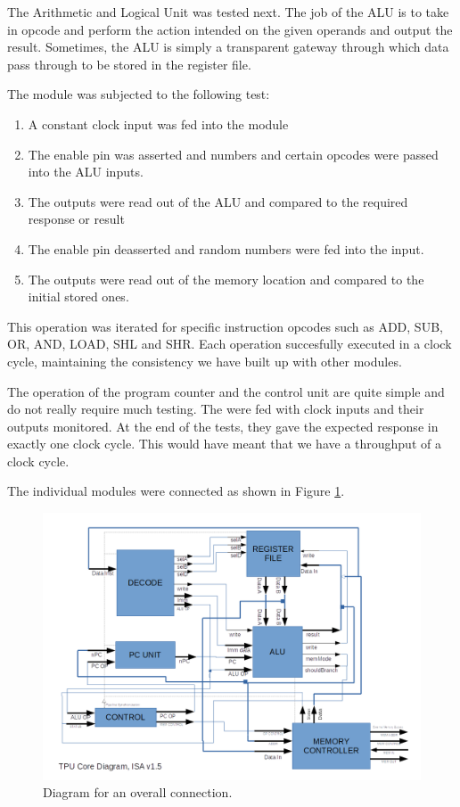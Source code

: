 The Arithmetic and Logical Unit was tested next. The job of the ALU is to take in opcode and perform the action intended on the given operands and output the result. Sometimes, the ALU is simply a transparent gateway through which data pass through to be stored in the register file. 

The module was subjected to the following test:
\begin{enumerate}
\item A constant clock input was fed into the module
\item The enable pin was asserted and numbers and certain opcodes were passed into the ALU inputs.
\item The outputs were read out of the ALU and compared to the required response or result
\item The enable pin deasserted and random numbers were fed into the input.
\item The outputs were read out of the memory location and compared to the initial stored ones.
\end{enumerate}

This operation was iterated for specific instruction opcodes such as ADD, SUB, OR, AND, LOAD, SHL and SHR. Each operation succesfully executed in a clock cycle, maintaining the consistency we have built up with other modules.

The operation of the program counter and the control unit are quite simple and do not really require much testing. The were fed  with clock inputs and their outputs  monitored. At the end of the tests, they gave the expected response in exactly one clock cycle. This would have meant that we have a throughput of a clock cycle.

The individual modules were connected as shown in Figure \ref{fig:TPU_CORE}.

\begin{figure}[p]
    \centering
    \includegraphics[scale = 0.6]{TPU_CORE}
	\caption{Diagram for an overall connection.}
    \label{fig:TPU_CORE}
\end{figure}
 
